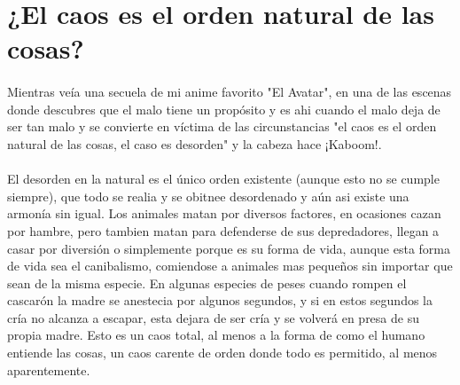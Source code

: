 \documentclass[12pt,letterpaper]{article}
\begin{document}
\section{¿El caos es el orden natural de las cosas?}
\paragraph{}
Mientras veía una secuela de mi anime favorito "El Avatar", en una de las escenas donde descubres que el malo tiene un propósito y es ahi cuando el malo deja de ser tan malo y se convierte en víctima de las circunstancias "el caos es el orden natural de las cosas, el caso es desorden" y la cabeza hace ¡Kaboom!.

\paragraph{}
El desorden en la natural es el único orden existente (aunque esto no se cumple siempre), que todo se realia  y se obitnee desordenado y aún asi existe una armonía sin igual. Los animales matan por diversos factores, en ocasiones cazan por hambre, pero tambien matan para defenderse de sus depredadores, llegan a casar por diversión o simplemente porque es su forma de vida, aunque esta forma de vida sea el canibalismo, comiendose a animales mas pequeños sin importar que sean de la misma especie. En algunas especies de peses cuando rompen el cascarón la madre se anestecia por algunos segundos, y si en estos segundos la cría no alcanza a escapar, esta dejara de ser cría y se volverá en presa de su propia madre. Esto es un caos total, al menos a la forma de como el humano entiende las cosas, un caos carente de orden donde todo es permitido, al menos aparentemente.
\end{document}
